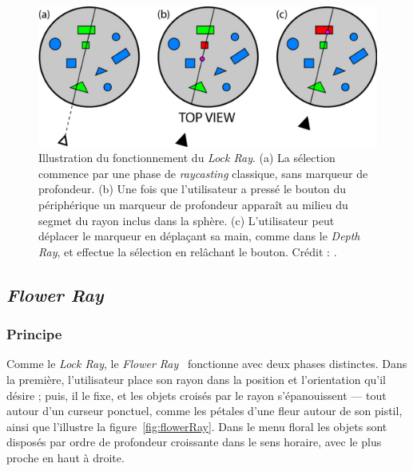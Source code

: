 	\begin{figure}[!htb]
		\centering
		\includegraphics[width=\rayWidth]{figures/ch2/lockRay}
		\caption[Principe du \emph{Lock Ray}]{Illustration du fonctionnement du \emph{Lock Ray}. (a) La sélection commence par une phase de \emph{raycasting} classique, sans marqueur de profondeur. (b) Une fois que l'utilisateur a pressé le bouton du périphérique un marqueur de profondeur apparaît au milieu du segmet du rayon inclus dans la sphère. (c) L'utilisateur peut déplacer le marqueur en déplaçant sa main, comme dans le \emph{Depth Ray}, et effectue la sélection en relâchant le bouton. Crédit : \cite{grossman2006design}.}
		\label{fig:lockRay}
	\end{figure}
	
	\subsection{\emph{Flower Ray}}
	\subsubsection{Principe}
	Comme le \emph{Lock Ray}, le \emph{Flower Ray}~\cite{grossman2006design} fonctionne avec deux phases distinctes. Dans la première, l'utilisateur place son rayon dans la position et l'orientation qu'il désire ; puis, il le fixe, et les objets croisés par le rayon \og s'épanouissent \fg{}  --- tout autour d'un curseur ponctuel, comme les pétales d'une fleur autour de son pistil, ainsi que l'illustre la figure~\ref{fig:flowerRay}. Dans le menu \og floral \fg{} les objets sont disposés par ordre de profondeur croissante dans le sens horaire, avec le plus proche en haut à droite.
	
